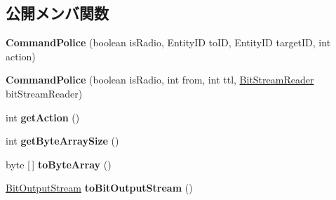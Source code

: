 \subsection*{公開メンバ関数}
\begin{DoxyCompactItemize}
\item 
\hypertarget{classadf_1_1agent_1_1communication_1_1standard_1_1bundle_1_1topdown_1_1CommandPolice_aa8cda9c94c7876cbd37c15925411aa23}{}\label{classadf_1_1agent_1_1communication_1_1standard_1_1bundle_1_1topdown_1_1CommandPolice_aa8cda9c94c7876cbd37c15925411aa23} 
{\bfseries Command\+Police} (boolean is\+Radio, Entity\+ID to\+ID, Entity\+ID target\+ID, int action)
\item 
\hypertarget{classadf_1_1agent_1_1communication_1_1standard_1_1bundle_1_1topdown_1_1CommandPolice_afdeb2bff9db87a9436ffb6171a437a16}{}\label{classadf_1_1agent_1_1communication_1_1standard_1_1bundle_1_1topdown_1_1CommandPolice_afdeb2bff9db87a9436ffb6171a437a16} 
{\bfseries Command\+Police} (boolean is\+Radio, int from, int ttl, \hyperlink{classadf_1_1component_1_1communication_1_1util_1_1BitStreamReader}{Bit\+Stream\+Reader} bit\+Stream\+Reader)
\item 
\hypertarget{classadf_1_1agent_1_1communication_1_1standard_1_1bundle_1_1topdown_1_1CommandPolice_a7abd4a426513be758360db96ced6954a}{}\label{classadf_1_1agent_1_1communication_1_1standard_1_1bundle_1_1topdown_1_1CommandPolice_a7abd4a426513be758360db96ced6954a} 
int {\bfseries get\+Action} ()
\item 
\hypertarget{classadf_1_1agent_1_1communication_1_1standard_1_1bundle_1_1topdown_1_1CommandPolice_a3e547d0aee9c3f35fee95f9c7de9b70e}{}\label{classadf_1_1agent_1_1communication_1_1standard_1_1bundle_1_1topdown_1_1CommandPolice_a3e547d0aee9c3f35fee95f9c7de9b70e} 
int {\bfseries get\+Byte\+Array\+Size} ()
\item 
\hypertarget{classadf_1_1agent_1_1communication_1_1standard_1_1bundle_1_1topdown_1_1CommandPolice_a57f726945e1cf968a6c82433f8b39cf9}{}\label{classadf_1_1agent_1_1communication_1_1standard_1_1bundle_1_1topdown_1_1CommandPolice_a57f726945e1cf968a6c82433f8b39cf9} 
byte \mbox{[}$\,$\mbox{]} {\bfseries to\+Byte\+Array} ()
\item 
\hypertarget{classadf_1_1agent_1_1communication_1_1standard_1_1bundle_1_1topdown_1_1CommandPolice_a750351c36ad0e796ab59d528ef7a8e03}{}\label{classadf_1_1agent_1_1communication_1_1standard_1_1bundle_1_1topdown_1_1CommandPolice_a750351c36ad0e796ab59d528ef7a8e03} 
\hyperlink{classadf_1_1component_1_1communication_1_1util_1_1BitOutputStream}{Bit\+Output\+Stream} {\bfseries to\+Bit\+Output\+Stream} ()

\end{DoxyCompactItemize}

